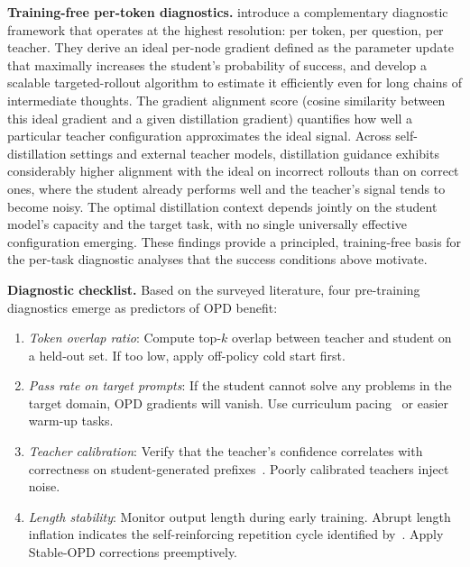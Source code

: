 \documentclass{article} %
\begin{document}
\textbf{Training-free per-token diagnostics.} \citet{2605.10889} introduce a complementary diagnostic framework that operates at the highest resolution: per token, per question, per teacher. They derive an ideal per-node gradient defined as the parameter update that maximally increases the student's probability of success, and develop a scalable targeted-rollout algorithm to estimate it efficiently even for long chains of intermediate thoughts. The gradient alignment score (cosine similarity between this ideal gradient and a given distillation gradient) quantifies how well a particular teacher configuration approximates the ideal signal. Across self-distillation settings and external teacher models, distillation guidance exhibits considerably higher alignment with the ideal on incorrect rollouts than on correct ones, where the student already performs well and the teacher's signal tends to become noisy. The optimal distillation context depends jointly on the student model's capacity and the target task, with no single universally effective configuration emerging. These findings provide a principled, training-free basis for the per-task diagnostic analyses that the success conditions above motivate.

\textbf{Diagnostic checklist.} Based on the surveyed literature, four pre-training diagnostics emerge as predictors of OPD benefit:
\begin{enumerate}[nosep]
    \item \textit{Token overlap ratio}: Compute top-$k$ overlap between teacher and student on a held-out set. If too low, apply off-policy cold start first.
    \item \textit{Pass rate on target prompts}: If the student cannot solve any problems in the target domain, OPD gradients will vanish. Use curriculum pacing~\citep{2603.11178} or easier warm-up tasks.
    \item \textit{Teacher calibration}: Verify that the teacher's confidence correlates with correctness on student-generated prefixes~\citep{2604.16830}. Poorly calibrated teachers inject noise.
    \item \textit{Length stability}: Monitor output length during early training. Abrupt length inflation indicates the self-reinforcing repetition cycle identified by~\citet{2604.08527}. Apply Stable-OPD corrections preemptively.
\end{enumerate}
\end{document}
